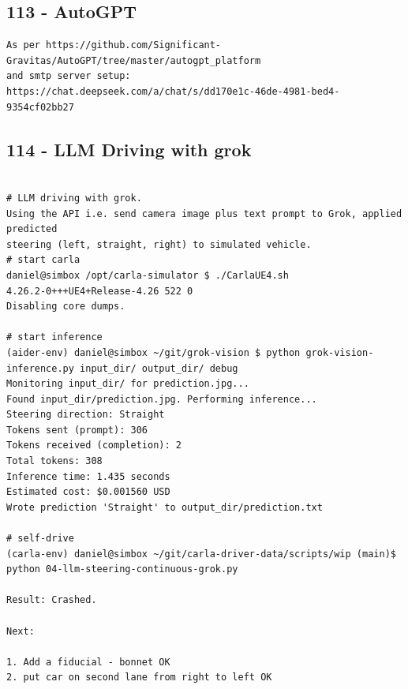 \subsection{113 - AutoGPT}
\label{app_res:113}

\begin{verbatim}
As per https://github.com/Significant-Gravitas/AutoGPT/tree/master/autogpt_platform
and smtp server setup:
https://chat.deepseek.com/a/chat/s/dd170e1c-46de-4981-bed4-9354cf02bb27

\end{verbatim}

\subsection{114 - LLM Driving with grok }
\label{app_res:114}

\begin{verbatim}

# LLM driving with grok.
Using the API i.e. send camera image plus text prompt to Grok, applied predicted 
steering (left, straight, right) to simulated vehicle.
# start carla
daniel@simbox /opt/carla-simulator $ ./CarlaUE4.sh 
4.26.2-0+++UE4+Release-4.26 522 0
Disabling core dumps.

# start inference
(aider-env) daniel@simbox ~/git/grok-vision $ python grok-vision-inference.py input_dir/ output_dir/ debug
Monitoring input_dir/ for prediction.jpg...
Found input_dir/prediction.jpg. Performing inference...
Steering direction: Straight
Tokens sent (prompt): 306
Tokens received (completion): 2
Total tokens: 308
Inference time: 1.435 seconds
Estimated cost: $0.001560 USD
Wrote prediction 'Straight' to output_dir/prediction.txt

# self-drive
(carla-env) daniel@simbox ~/git/carla-driver-data/scripts/wip (main)$ python 04-llm-steering-continuous-grok.py

Result: Crashed. 

Next:

1. Add a fiducial - bonnet OK
2. put car on second lane from right to left OK

\end{verbatim}

